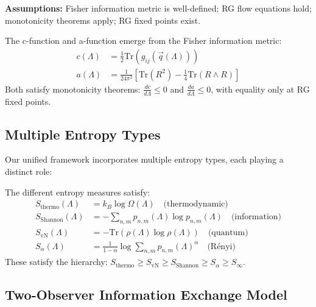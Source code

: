 \begin{notation}[Hypotheses]
\label{not:hypotheses-c-a}
\textbf{Assumptions:} Fisher information metric is well-defined; RG flow equations hold; monotonicity theorems apply; RG fixed points exist.
\end{notation}

\begin{theorem}
\label{thm:c-a-functions}
The c-function and a-function emerge from the Fisher information metric:
\begin{align}
c(\Lambda) &= \frac{1}{2} \text{Tr}(g_{ij}(\vec{q}(\Lambda))) \\
a(\Lambda) &= \frac{1}{24\pi^2} \left[ \text{Tr}(R^2) - \frac{1}{4}\text{Tr}(R \wedge R) \right]
\end{align}
Both satisfy monotonicity theorems: $\frac{dc}{d\Lambda} \leq 0$ and $\frac{da}{d\Lambda} \leq 0$, with equality only at RG fixed points.
\end{theorem}

\subsection{Multiple Entropy Types}

Our unified framework incorporates multiple entropy types, each playing a distinct role:

\begin{definition}
\label{def:entropy-hierarchy}
The different entropy measures satisfy:
\begin{align}
S_{\text{thermo}}(\Lambda) &= k_B \log \Omega(\Lambda) \quad \text{(thermodynamic)} \\
S_{\text{Shannon}}(\Lambda) &= -\sum_{n,m} p_{n,m}(\Lambda) \log p_{n,m}(\Lambda) \quad \text{(information)} \\
S_{\text{vN}}(\Lambda) &= -\text{Tr}(\rho(\Lambda) \log \rho(\Lambda)) \quad \text{(quantum)} \\
S_{\alpha}(\Lambda) &= \frac{1}{1-\alpha} \log \sum_{n,m} p_{n,m}(\Lambda)^\alpha \quad \text{(Rényi)}
\end{align}
These satisfy the hierarchy: $S_{\text{thermo}} \geq S_{\text{vN}} \geq S_{\text{Shannon}} \geq S_{\alpha} \geq S_{\infty}$.
\end{definition}

\subsection{Two-Observer Information Exchange Model}

